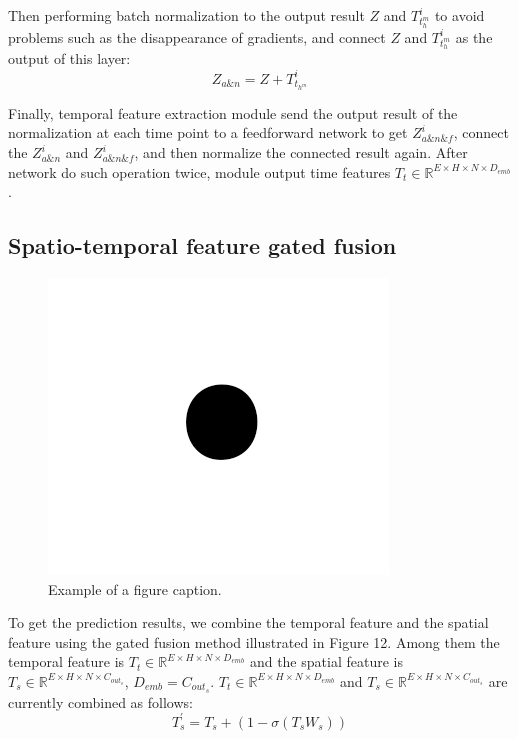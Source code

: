 \documentclass[conference]{IEEEtran}
\begin{document}
\par
Then performing batch normalization to the output result $Z$ and $T^i_{t_h^m}$ to avoid problems such as the disappearance of gradients, and connect $Z$ and $T^i_{t_h^m}$ as the output of this layer:
\begin{equation}
    Z_{a\&n} = Z + T_{t_{h^m}}^i
\end{equation}
\par 
Finally, temporal feature extraction module send the output result of the normalization at each time point to a feedforward network to get $Z_{a\&n\&f}^i$, connect the $Z_{a\&n}^i$ and $Z_{a\&n\&f}^i$, and then normalize the connected result again. After network do such operation twice, module output time features $T_t \in \mathbb{R}^{E \times H \times N \times D_{emb}} $.

\subsection{Spatio-temporal feature gated fusion}

\begin{figure}[htbp]
    \centerline{\includegraphics{fig1.png}}
    \caption{Example of a figure caption.}
    \label{fig}
\end{figure}

\par
To get the prediction results, we combine the temporal feature and the spatial feature using the gated fusion method illustrated in Figure 12. Among them the temporal feature is $T_t \in \mathbb{R} ^ {E \times H \times N \times D_{emb}}$ and the spatial feature is $T_s \in \mathbb{R} ^ {E \times H \times N \times C_{out_{s}}}$, $D_{emb} = C_{out_s}$. $T_t \in \mathbb{R}^{E \times H \times N \times {D}_{emb}} $ and $T_s \in \mathbb{R} ^ {E \times H \times N \times C_{out_s}} $ are currently combined as follows:
\begin{equation}
    T_s^{\prime}= T_s + (1 - \sigma(T_sW_s))
\end{equation}
\end{document}
